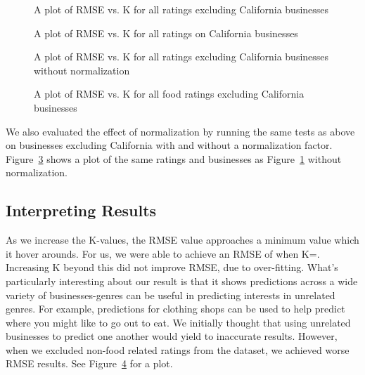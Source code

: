 \begin{figure}[ht!]
	\centering
	\caption[]{A plot of RMSE vs. K for all ratings excluding California businesses}
	\label{fig:nocal}
\end{figure}


\begin{figure}[ht!]
	\centering
	\caption[]{A plot of RMSE vs. K for all ratings on California businesses}
	\label{fig:cal}
\end{figure}

\begin{figure}[ht!]
	\centering
	\caption[]{A plot of RMSE vs. K for all ratings excluding 
California businesses without normalization}
	\label{fig:norm}
\end{figure}

\begin{figure}[ht!]
	\centering
	\caption[]{A plot of RMSE vs. K for all food ratings excluding California businesses}
	\label{fig:foodonly}
\end{figure}

We also evaluated the effect of normalization by running the same tests as
above on businesses excluding California with and without a normalization
factor. Figure~\ref{fig:norm} shows a plot of the same ratings and businesses
as Figure~\ref{fig:nocal} without normalization.

\subsection{Interpreting Results}
As we increase the K-values, the RMSE value approaches a minimum value which it
hover arounds. For us, we were able to achieve an RMSE of \bestRMSE when
K=\bestK. Increasing K beyond this did not improve RMSE, due to over-fitting.
What's particularly interesting about our result is that it shows predictions
across a wide variety of businesses-genres can be useful in predicting
interests in unrelated genres. For example, predictions for clothing shops can
be used to help predict where you might like to go out to eat. We initially
thought that using unrelated businesses to predict one another would yield to
inaccurate results. However, when we excluded non-food related ratings from the
dataset, we achieved worse RMSE results. See Figure~\ref{fig:foodonly} for a
plot.


